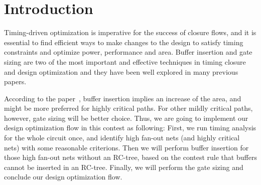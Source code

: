 \section{Introduction}
Timing-driven optimization is imperative for the success of closure flows, and it is essential to find efficient ways to make changes to the design to satisfy timing constraints and optimize power, performance and area. Buffer insertion and gate sizing are two of the most important and effective techniques in timing closure and design optimization and they have been well explored in many previous papers. 

According to the paper~\cite{Jiang:Interleaving}, buffer insertion implies an increase of the area, and might be more preferred for highly critical paths. For other mildly critical paths, however, gate sizing will be better choice. Thus, we are going to implement our design optimization flow in this contest as following: First, we run timing analysis for the whole circuit once, and identify high fan-out nets (and highly critical nets) with some reasonable criterions. Then we will perform buffer insertion for those high fan-out nets without an RC-tree, based on the contest rule that buffers cannot be inserted in an RC-tree. Finally, we will perform the gate sizing and conclude our design optimization flow.




